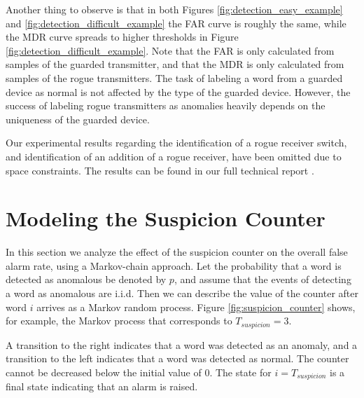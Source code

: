 \documentclass[english]{llncs}
\newcommand{\level}[1]{\section{#1}}
\newcommand{\level}[1]{\chapter{#1}}
\begin{document}
  Another thing to observe is that in both Figures \ref{fig:detection_easy_example} and \ref{fig:detection_difficult_example} the FAR curve is roughly the same, while the MDR curve spreads to higher thresholds in Figure \ref{fig:detection_difficult_example}. Note that the FAR is only calculated from samples of the guarded transmitter, and that the MDR is only calculated from samples of the rogue transmitters. The task of labeling a word from a guarded device as normal is not affected by the type of the guarded device. However, the success of
  labeling rogue transmitters as anomalies heavily depends on the uniqueness of the guarded device.
  
  Our experimental results regarding the identification of a rogue receiver switch, and identification of an addition of a rogue receiver, have been omitted due to space constraints. The results can be found in our full technical report \cite{gilboa-markevich2020hardware}.
  
\level{Modeling the Suspicion Counter} \label{ModelingSuspicionCounter}
  In this section we analyze the effect of the suspicion counter on the overall false alarm rate, using a Markov-chain approach. Let the probability that a word is detected as anomalous be denoted by $p$, and assume that the events of detecting a word as anomalous are i.i.d. 
  Then we can describe the value of the counter after word $i$ arrives as a Markov random process. 
  Figure \ref{fig:suspicion_counter} shows, for example, the Markov process that corresponds to $T_{suspicion} = 3$.
  
  A transition to the right indicates that a word was detected as an anomaly, and a transition to the left indicates that a word was detected as normal. 
  The counter cannot be decreased below the initial value of 0. The state for $i = T_{suspicion}$ is a final state indicating that an alarm is raised.
  
\end{document}
